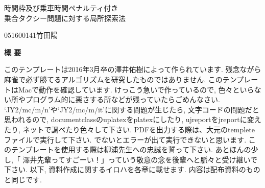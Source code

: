 \begin{center}
{\LARGE 時間枠及び乗車時間ペナルティ付き\\乗合タクシー問題に対する局所探索法}\\[0.5cm]
\end{center}
\hfill
{\large 051600141\qquad 竹田陽}\\[0.5cm]
\begin{center}
{\Large \bf 概 要}\\
\end{center}

このテンプレートは2016年3月卒の澤井佑樹によって作られています.
残念ながら麻雀で必ず勝てるアルゴリズムを研究したものではありません.
このテンプレートはMacで動作を確認しています.
けっこう急いで作っているので, 色々といらない所やプログラム的に悪さする所などが残っていたらごめんなさい.
`JY2/mc/m/n'や`JY2/mc/m/it'に関する問題が生じたら, 文字コードの問題だと思われるので,
documentclassのuplatexをplatexにしたり, ujreportをjreportに変えたり, ネットで調べたり色々して下さい.
PDFを出力する際は、大元のtempleteファイルで実行して下さい.
でないとエラーが出て実行できないと思います.
このテンプレートを使用する際は柳浦先生への忠誠を誓って下さい.
あとほんの少し,「 澤井先輩ってすごーい！」っていう敬意の念を後輩へと脈々と受け継いで下さい.
以下, 資料作成に関するイロハを各章に載せます.
内容は配布資料のものと同じです.
